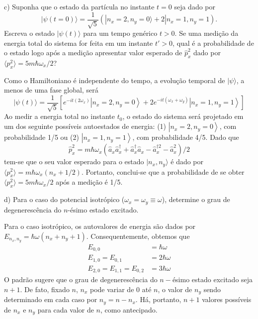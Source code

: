 \begin{enumerate}[start=1,label={\bfseries Q\arabic*.}]
c) Suponha que o estado da partícula no instante $t=0$ seja dado por
$$
| \psi(t=0) \rangle = \frac{1}{\sqrt{5}} \left( |n_{x} = 2, n_{y} = 0 \rangle + 2|n_{x} = 1, n_{y} = 1  \right).
$$
Escreva o estado $|\psi(t) \rangle$ para um tempo genérico $t > 0$. Se uma medição da energia total do sistema for feita em um instante $t' > 0$, qual é a probabilidade de o estado logo após a medição apresentar valor esperado de $\hat{p}_{x}^{2}$ dado por $\langle p_{x}^{2} \rangle = 5 m \hbar \omega_{x} / 2$?

\resposta Como o Hamiltoniano é independente do tempo, a evolução temporal de $| \psi \rangle$, a menos de uma fase global, será
$$
|\psi(t)\rangle=\frac{1}{\sqrt{5}}\left[e^{-i t\left(2 \omega_{x}\right)}\left|n_{x}=2, n_{y}=0\right\rangle+2 e^{-i t\left(\omega_{x}+\omega_{y}\right)}\left|n_{x}=1, n_{y}=1\right\rangle\right]
$$
Ao medir a energia total no instante $t_{0}$, o estado do sistema será projetado em um dos seguinte possíveis autoestados de energia: (1) $\left|n_{x}=2, n_{y}=0\right\rangle$, com probabilidade 1/5 ou (2) $\left|n_{x}=1, n_{y}=1\right\rangle$, com probabilidade 4/5. Dado que
$$
\hat{p}_{x}^{2}=m \hbar \omega_{x}\left(\hat{a}_{x} \hat{a}_{x}^{\dagger}+\hat{a}_{x}^{\dagger} \hat{a}_{x}-\hat{a}_{x}^{\dagger 2}-\hat{a}_{x}^{2}\right) / 2
$$
tem-se que o seu valor esperado para o estado $|n_{x},n_{y}\rangle$ é dado por $\langle p_{x}^{2} \rangle = m \hbar \omega_{x} (n_{x} + 1/2)$. Portanto, conclui-se que a probabilidade de se obter$\langle p_{x}^{2} \rangle = 5 m \hbar \omega_{x}/2 $ após a medição é 1/5.

d) Para o caso do potencial isotrópico ($\omega_{x} = \omega_{y} \equiv \omega$), determine o grau de degenerescência do $n$-ésimo estado excitado.

\resposta Para o caso isotrópico, os autovalores de energia são dados por $E_{n_{x},n_{y}} = \hbar \omega (n_{x} + n_{y} + 1)$. Consequentemente, obtemos que
$$
\begin{aligned}
E_{0,0} &=\hbar \omega \\
E_{1,0}=E_{0,1} &=2 \hbar \omega \\
E_{2,0}=E_{1,1}=E_{0,2} &=3 \hbar \omega
\end{aligned}
$$
O padrão sugere que o grau de degenerescência do $n-$ésimo estado excitado seja $n + 1$. De fato, fixado $n$, $n_{x}$ pode variar de 0 até $n$, o valor de $n_{y}$ sendo determinado em cada caso por $n_{y} = n - n_{x}$. Há, portanto, $n + 1$ valores possíveis de $n_{x}$ e $n_{y}$ para cada valor de $n$, como antecipado.







\end{enumerate}
